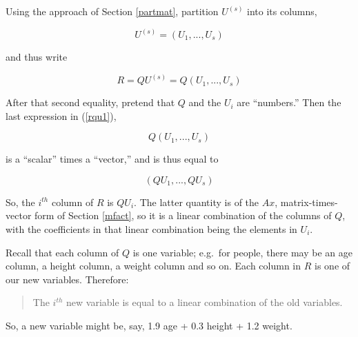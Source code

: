 Using the approach of Section \ref{partmat}, partition $U^{(s)}$ into
its columns,

\begin{equation}
U^{(s)} = (U_1,...,U_s) 
\end{equation}

and thus write

\begin{equation}
\label{rqu1}
R = Q U^{(s)} = Q (U_1,...,U_s)
\end{equation} 

After that second equality, pretend that $Q$ and the $U_i$ are
``numbers.''  Then the last expression in (\ref{rqu1}),

\begin{equation}
Q (U_1,...,U_s)
\end{equation}

is a ``scalar'' times a ``vector,'' and is thus equal to 

\begin{equation}
(QU_1,...,QU_s)
\end{equation}

So, the $i^{th}$ column of $R$ is $Q U_i$.  The latter quantity is of
the $Ax$, matrix-times-vector form of Section \ref{mfact}, so it is a
linear combination of the columns of $Q$, with the coefficients in that
linear combination being the elements in $U_i$.  

Recall that each column of $Q$ is one variable; e.g.\ for people, there
may be an age column, a height column, a weight column and so on.  Each
column in $R$ is one of our new variables.  Therefore:

\begin{quote}
The $i^{th}$ new variable is equal to a linear combination of the old
variables.
\end{quote}

So, a new variable might be, say, 1.9 age + 0.3 height + 1.2 weight.


